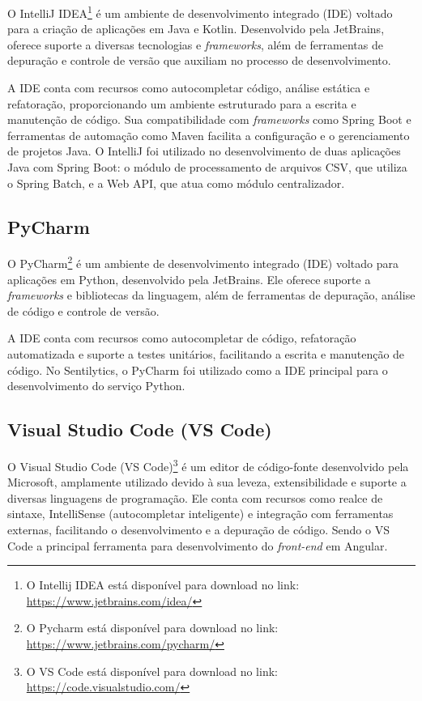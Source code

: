\documentclass[
	12pt,				%
	oneside,			%
	a4paper,			%
	english,			%
	french,				%
	spanish,			%
	brazil				%
	]{abntex2}
\begin{document}
O IntelliJ IDEA\footnote{O Intellij IDEA está disponível para download
  no link: \url{https://www.jetbrains.com/idea/}} é um ambiente de
desenvolvimento integrado (IDE) voltado para a criação de aplicações em
Java e Kotlin. Desenvolvido pela JetBrains, oferece suporte a diversas
tecnologias e \emph{frameworks}, além de ferramentas de depuração e
controle de versão que auxiliam no processo de desenvolvimento.

A IDE conta com recursos como autocompletar código, análise estática e
refatoração, proporcionando um ambiente estruturado para a escrita e
manutenção de código. Sua compatibilidade com \emph{frameworks} como
Spring Boot e ferramentas de automação como Maven facilita a
configuração e o gerenciamento de projetos Java. O IntelliJ foi
utilizado no desenvolvimento de duas aplicações Java com Spring Boot: o
módulo de processamento de arquivos CSV, que utiliza o Spring Batch, e a
Web API, que atua como módulo centralizador.

\hypertarget{pycharm}{%
\subsection{PyCharm}\label{pycharm}}

O PyCharm\footnote{O Pycharm está disponível para download no link:
  \url{https://www.jetbrains.com/pycharm/}} é um ambiente de
desenvolvimento integrado (IDE) voltado para aplicações em Python,
desenvolvido pela JetBrains. Ele oferece suporte a \emph{frameworks} e
bibliotecas da linguagem, além de ferramentas de depuração, análise de
código e controle de versão.

A IDE conta com recursos como autocompletar de código, refatoração
automatizada e suporte a testes unitários, facilitando a escrita e
manutenção de código. No Sentilytics, o PyCharm foi utilizado como a IDE
principal para o desenvolvimento do serviço Python.

\hypertarget{visual-studio-code-vs-code}{%
\subsection{Visual Studio Code (VS
Code)}\label{visual-studio-code-vs-code}}

O Visual Studio Code (VS Code)\footnote{O VS Code está disponível para
  download no link: \url{https://code.visualstudio.com/}} é um editor de
código-fonte desenvolvido pela Microsoft, amplamente utilizado devido à
sua leveza, extensibilidade e suporte a diversas linguagens de
programação. Ele conta com recursos como realce de sintaxe, IntelliSense
(autocompletar inteligente) e integração com ferramentas externas,
facilitando o desenvolvimento e a depuração de código. Sendo o VS Code a
principal ferramenta para desenvolvimento do \emph{front-end} em
Angular.
\end{document}
